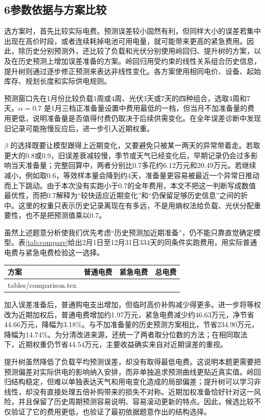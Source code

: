 \documentclass[11pt,a4paper]{article}
\makeatletter
\newcommand{\tableinput}[1]{\@@input #1 }
\newenvironment{inlinetable}{\par\addvspace{7pt}\noindent\begin{minipage}{\linewidth}\def\@captype{table}\centering\small}{\end{minipage}\par\addvspace{7pt}}
\makeatother
\begin{document}
\subsection*{6\quad 参数依据与方案比较}

选方案时，首先比较实际电费。预测误差较小固然有利，但同样大小的误差若集中出现在高价时段，或者连续耗掉电池可用电量，就可能带来更高的紧急费用。因此，除历史分别预测外，还比较了负载和光伏分别使用岭回归、提升树的方案，以及在历史预测上增加误差准备的方案。岭回归用受约束的线性关系组合历史信息，提升树则通过逐步修正预测来表达非线性变化。各方案使用相同电价、设备、起始库存、规划长度和实际供电规则。

预测窗口先在1月份比较负载1周或4周、光伏3天或7天的四种组合，选取4周和7天。$\alpha=0.7$ 是1月三档正准备量设置中费用最低的一档，但当月不加准备量的费用更低，说明准备量是否值得付费仍取决于后续供需变化。在全年误差诊断中发现旧记录可能拖慢反应后，进一步引入近期权重。

$\beta$ 的选择既要让模型跟得上近期变化，又要避免只被某一两天的异常带着走。若取更大的0.8或0.9，旧误差衰减较慢，季节或天气已经变化后，早期记录仍会过多影响当天准备量；完整回算中，两者分别比0.7多花约6.12万元和20.49万元。若继续减小，例如取0.6，等效样本量会降到约4天，准备量更容易被最近一个异常日推动而上下跳动。由于本次没有实跑小于0.7的全年费用，本文不把这一判断写成数值最优性，而把0.7解释为“较快适应近期变化”和“仍保留足够历史信息”之间的折中。这里的权重只表示历史记录离现在有多远，不是用熵权法给负载、光伏分配重要性，也不是把预测值乘以0.7。

虽然上述题意分析使我们优先考虑“历史预测加近期准备”，仍不能只靠直觉确定模型。表\ref{tab:compare}给出2月1日至12月31日334天的同条件实跑费用，用实际普通电费与紧急电费检验这一选择。
\begin{inlinetable}
\caption{不同方案的334天实际购电费用（万元）}\label{tab:compare}
\begin{tabular}{lrrr}\toprule
方案 & 普通电费 & 紧急电费 & 总电费\\\midrule
\tableinput{tables/comparison.tex}
\bottomrule\end{tabular}
\end{inlinetable}

加入误差准备后，普通购电支出增加，但临时高价补购减少得更多。进一步将等权改为近期加权后，普通电费增加约1.97万元，紧急电费减少约46.63万元，净节省44.66万元，降幅为3.18\%。与不加准备量的历史预测方案相比，节省234.90万元，降幅为14.74\%。为分清改进来源，还统一了两者取分位数的方法；在相同取法下，近期权重仍节省44.54万元，主要收益确实来自对近期误差的重视。

提升树虽然降低了负载平均预测误差，却没有取得最低电费。这说明本题更需要把预测偏差对实际供电的影响纳入安排，而非单独追求预测曲线更贴近真实值。岭回归结构稳定，但难以单独表达天气和用电变化造成的局部偏差；提升树可以学习非线性，却没有直接处理五倍补购带来的损失不对称。近期加权准备恰好针对这一风险，并且保留了历史周期预测容易说明、容易滚动更新的特点。因此，候选比较不仅验证了它的费用更低，也验证了最初依据题意作出的结构选择。
\end{document}

